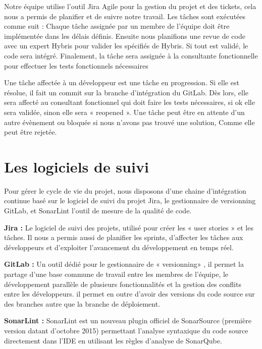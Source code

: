 Notre équipe utilise l'outil Jira Agile pour la gestion du projet et des tickets, cela nous a permis de planifier et de suivre notre travail.
Les tâches sont exécutées comme suit :
Chaque tâche assignée par un membre de l’équipe doit être implémentée dans les délais définis. Ensuite nous planifions une revue de code avec un expert Hybris pour valider les spécifiés de Hybris. Si tout est validé, le code sera intégré. Finalement, la tâche sera assignée à la consultante fonctionnelle pour effectuer les tests fonctionnels nécessaires

Une tâche affectée à un développeur est une tâche en progression. Si elle est résolue, il fait un commit sur la branche d’intégration du GitLab. Dès lors, elle sera affecté au consultant fonctionnel qui doit faire les tests nécessaires, si ok elle sera validée, sinon elle sera « reopened ». Une tâche peut être en attente d'un autre évènement ou bloquée si nous n'avons pas trouvé une solution, Comme elle peut être rejetée.



\section{Les logiciels de suivi}

Pour gérer le cycle de vie du projet, nous disposons d’une chaine d’intégration continue basé sur le logiciel de suivi du projet Jira, le gestionnaire de versionning GitLab, et SonarLint l’outil de mesure de la qualité de code.

\textbf{Jira :} Le logiciel de suivi des projets, utilisé pour créer les « user stories » et les tâches. Il nous a permis aussi de planifier les sprints, d'affecter les tâches aux développeurs et d'exploiter l'avancement du développement en temps réel.

\textbf{GitLab :} Un outil dédié pour le gestionnaire de « versionning» , il permet la partage d'une base commune de travail entre les membres de l’équipe, le développement parallèle de plusieurs fonctionnalités et la gestion des conflits entre les développeurs. il permet en outre d'avoir des versions du code source sur des branches autre que la branche de déploiement.

\textbf{SonarLint :} SonarLint est un nouveau plugin officiel de SonarSource (première version datant d'octobre 2015) permettant l’analyse syntaxique du code source directement dans l'IDE en utilisant les règles d'analyse de SonarQube.
\newpage




